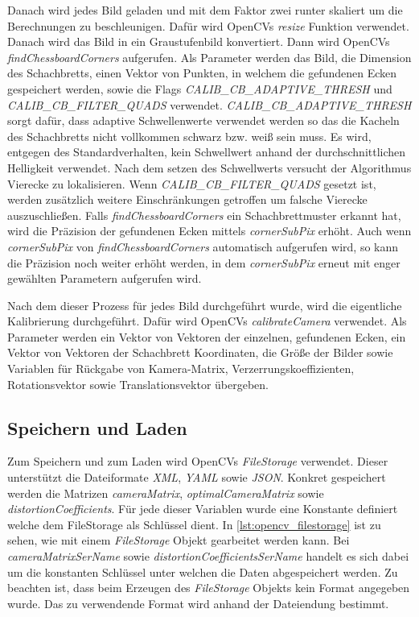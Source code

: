 Danach wird jedes Bild geladen und mit dem Faktor zwei runter skaliert um die Berechnungen zu beschleunigen.
Dafür wird OpenCVs \emph{resize}\cite{opencv_doc_resize} Funktion verwendet.
Danach wird das Bild in ein Graustufenbild konvertiert\cite{opencv_doc_cvt_color}.
Dann wird OpenCVs \emph{findChessboardCorners}\cite{opencv_doc_find_chessboard_corners} aufgerufen.
Als Parameter werden das Bild, die Dimension des Schachbretts, einen Vektor von Punkten, in welchem die gefundenen Ecken gespeichert werden, sowie die Flags \emph{CALIB\_CB\_ADAPTIVE\_THRESH} und \emph{CALIB\_CB\_FILTER\_QUADS} verwendet.
\emph{CALIB\_CB\_ADAPTIVE\_THRESH} sorgt dafür, dass adaptive Schwellenwerte verwendet werden so das die Kacheln des Schachbretts nicht vollkommen schwarz bzw. weiß sein muss.
Es wird, entgegen des Standardverhalten, kein Schwellwert anhand der durchschnittlichen Helligkeit verwendet\cite{opencv_doc_find_chessboard_corners}.
Nach dem setzen des Schwellwerts versucht der Algorithmus Vierecke zu lokalisieren.
Wenn \emph{CALIB\_CB\_FILTER\_QUADS} gesetzt ist, werden zusätzlich weitere Einschränkungen getroffen um falsche Vierecke auszuschließen\cite{opencv_doc_find_chessboard_corners}.
Falls \emph{findChessboardCorners} ein Schachbrettmuster erkannt hat, wird die Präzision der gefundenen Ecken mittels \emph{cornerSubPix}\cite{opencv_doc_corner_sub_pix} erhöht.
Auch wenn \emph{cornerSubPix} von \emph{findChessboardCorners} automatisch aufgerufen wird, so kann die Präzision noch weiter erhöht werden, in dem \emph{cornerSubPix} erneut mit enger gewählten Parametern aufgerufen wird.

Nach dem dieser Prozess für jedes Bild durchgeführt wurde, wird die eigentliche Kalibrierung durchgeführt.
Dafür wird OpenCVs \emph{calibrateCamera}\cite{opencv_doc_calibrate_camera} verwendet.
Als Parameter werden ein Vektor von Vektoren der einzelnen, gefundenen Ecken, ein Vektor von Vektoren der Schachbrett Koordinaten, die Größe der Bilder sowie Variablen für Rückgabe von Kamera-Matrix, Verzerrungskoeffizienten, Rotationsvektor sowie Translationsvektor übergeben.



\subsection{Speichern und Laden}\label{sec:calibration-load-save}
Zum Speichern und zum Laden wird OpenCVs \emph{FileStorage}\cite{opencv_doc_file_storage} verwendet.
Dieser unterstützt die Dateiformate \emph{XML}, \emph{YAML} sowie \emph{JSON}.
Konkret gespeichert werden die Matrizen \emph{cameraMatrix}, \emph{optimalCameraMatrix} sowie \emph{distortionCoefficients}.
Für jede dieser Variablen wurde eine Konstante definiert welche dem FileStorage als Schlüssel dient.
In \autoref{lst:opencv_filestorage} ist zu sehen, wie mit einem \emph{FileStorage} Objekt gearbeitet werden kann.
Bei \emph{cameraMatrixSerName} sowie \emph{distortionCoefficientsSerName} handelt es sich dabei um die konstanten Schlüssel unter welchen die Daten abgespeichert werden.
Zu beachten ist, dass beim Erzeugen des \emph{FileStorage} Objekts kein Format angegeben wurde.
Das zu verwendende Format wird anhand der Dateiendung bestimmt.


